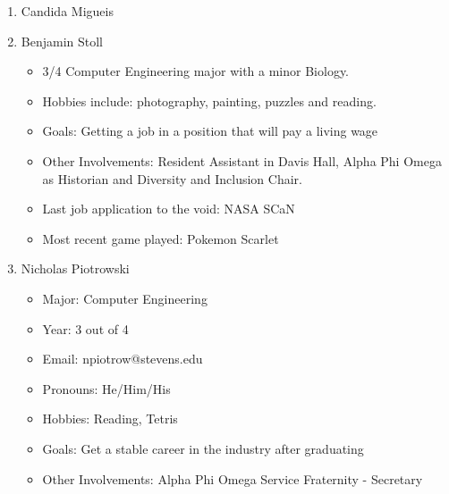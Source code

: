 \begin{enumerate}
    \item Candida Migueis
    \item Benjamin Stoll
        \begin{itemize}
            \item 3/4 Computer Engineering major with a minor Biology. 
            \item Hobbies include: photography, painting, puzzles and reading.
            \item Goals: Getting a job in a position that will pay a living wage
            \item Other Involvements: Resident Assistant in Davis Hall, Alpha Phi Omega as Historian and Diversity and Inclusion Chair.
            \item Last job application to the void: NASA SCaN
            \item Most recent game played: Pokemon Scarlet
        \end{itemize}
    \item Nicholas Piotrowski
        \begin{itemize}
            \item Major: Computer Engineering
            \item Year: 3 out of 4
            \item Email: npiotrow@stevens.edu
            \item Pronouns: He/Him/His
            \item Hobbies: Reading, Tetris
            \item Goals: Get a stable career in the industry after graduating
            \item Other Involvements: Alpha Phi Omega Service Fraternity - Secretary
        \end{itemize}
\end{enumerate}
